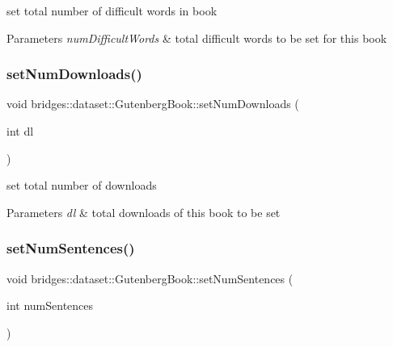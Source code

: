 set total number of difficult words in book 
\begin{DoxyParams}{Parameters}
{\em num\+Difficult\+Words} & total difficult words to be set for this book \\
\hline
\end{DoxyParams}
\mbox{\label{classbridges_1_1dataset_1_1_gutenberg_book_aacf716498f942400c65fdc3068008f61}} 
\subsubsection{\texorpdfstring{set\+Num\+Downloads()}{setNumDownloads()}}
{\footnotesize\ttfamily void bridges\+::dataset\+::\+Gutenberg\+Book\+::set\+Num\+Downloads (\begin{DoxyParamCaption}\item[{int}]{dl }\end{DoxyParamCaption})\hspace{0.3cm}{\ttfamily [inline]}}

set total number of downloads 
\begin{DoxyParams}{Parameters}
{\em dl} & total downloads of this book to be set \\
\hline
\end{DoxyParams}
\mbox{\label{classbridges_1_1dataset_1_1_gutenberg_book_a6b02a1584f47b34389ce2c9fe71129c6}} 
\subsubsection{\texorpdfstring{set\+Num\+Sentences()}{setNumSentences()}}
{\footnotesize\ttfamily void bridges\+::dataset\+::\+Gutenberg\+Book\+::set\+Num\+Sentences (\begin{DoxyParamCaption}\item[{int}]{num\+Sentences }\end{DoxyParamCaption})\hspace{0.3cm}{\ttfamily [inline]}}

